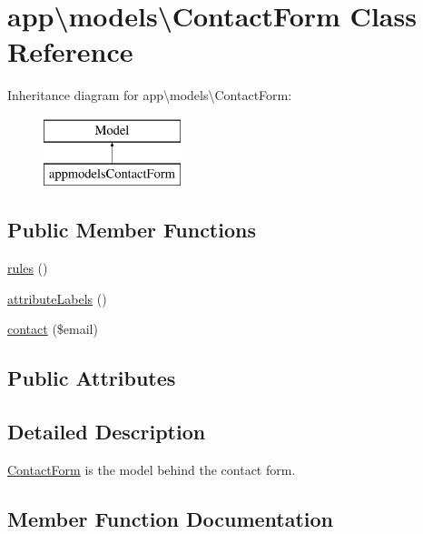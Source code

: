 \hypertarget{classapp_1_1models_1_1ContactForm}{}\section{app\textbackslash{}models\textbackslash{}Contact\+Form Class Reference}
\label{classapp_1_1models_1_1ContactForm}
Inheritance diagram for app\textbackslash{}models\textbackslash{}Contact\+Form\+:\begin{figure}[H]
\begin{center}
\leavevmode
\includegraphics[height=2.000000cm]{classapp_1_1models_1_1ContactForm}
\end{center}
\end{figure}
\subsection*{Public Member Functions}
\begin{DoxyCompactItemize}
\item 
\hyperlink{classapp_1_1models_1_1ContactForm_a346c2c44cbe7a82c2e8f1de2f1958bb9}{rules} ()
\item 
\hyperlink{classapp_1_1models_1_1ContactForm_ad11e74305da95f8e2cd13d0eb15fe771}{attribute\+Labels} ()
\item 
\hyperlink{classapp_1_1models_1_1ContactForm_a42e6b6499a29df52c36ad4b2dfb2fe1a}{contact} (\$email)
\end{DoxyCompactItemize}
\subsection*{Public Attributes}
\begin{DoxyCompactItemize}
\end{DoxyCompactItemize}


\subsection{Detailed Description}
\hyperlink{classapp_1_1models_1_1ContactForm}{Contact\+Form} is the model behind the contact form. 

\subsection{Member Function Documentation}
